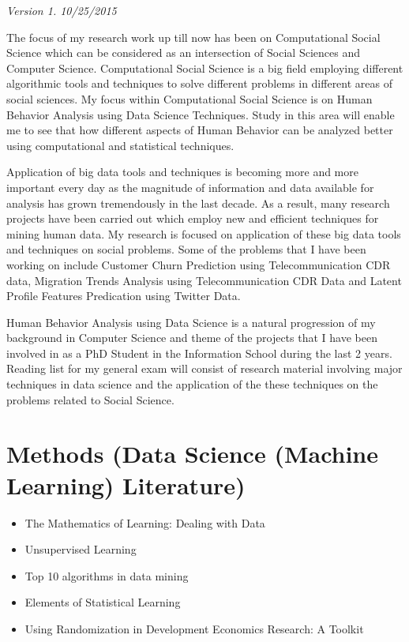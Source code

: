 \textit{Version 1. 10/25/2015} 

The focus of my research work up till now has been on Computational Social Science which can be considered as an intersection of Social Sciences and Computer Science. Computational Social Science is a big field employing different algorithmic tools and techniques to solve different problems in different areas of social sciences. My focus within Computational Social Science is on Human Behavior Analysis using Data Science Techniques. Study in this area will enable me to see that how different aspects of Human Behavior can be analyzed better using computational and statistical techniques.

Application of big data tools and techniques is becoming more and more important every day as the magnitude of information and data available for analysis has grown tremendously in the last decade. As a result, many research projects have been carried out which employ new and efficient techniques for mining human data. My research is focused on application of these big data tools and techniques on social problems. Some of the problems that I have been working on include Customer Churn Prediction using Telecommunication CDR data, Migration Trends Analysis using Telecommunication CDR Data  and Latent Profile Features Predication using Twitter Data.

Human Behavior Analysis using Data Science is a natural progression of my background in Computer Science and theme of the projects that I have been involved in as a PhD Student in the Information School during the last 2 years. 
Reading list for my general exam will consist of research material involving major techniques in data science and the application of the these techniques on the problems related to Social Science. 

\section{Methods (Data Science (Machine Learning) Literature)}
\begin{itemize}
\item The Mathematics of Learning: Dealing with Data\cite{Poggio_2005}
\end{itemize}
\begin{itemize}
\item Unsupervised Learning \cite{Ghahramani_2004}
\end{itemize}
\begin{itemize}
\item Top 10 algorithms in data mining \cite{2009}
\end{itemize}
\begin{itemize}
\item Elements of Statistical Learning \cite{StatisticalLearning_2009}
\end{itemize}
\begin{itemize}
\item Using Randomization in Development Economics Research: A Toolkit \cite{Duflo} 
\end{itemize}

